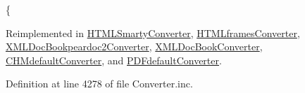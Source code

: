 \{ 

\-Reimplemented in \hyperlink{class_h_t_m_l_smarty_converter_a48d30cbead70c887449fda723aa0bb6e}{\-H\-T\-M\-L\-Smarty\-Converter}, \hyperlink{class_h_t_m_lframes_converter_a48d30cbead70c887449fda723aa0bb6e}{\-H\-T\-M\-Lframes\-Converter}, \hyperlink{class_x_m_l_doc_bookpeardoc2_converter_a48d30cbead70c887449fda723aa0bb6e}{\-X\-M\-L\-Doc\-Bookpeardoc2\-Converter}, \hyperlink{class_x_m_l_doc_book_converter_a48d30cbead70c887449fda723aa0bb6e}{\-X\-M\-L\-Doc\-Book\-Converter}, \hyperlink{class_c_h_mdefault_converter_a48d30cbead70c887449fda723aa0bb6e}{\-C\-H\-Mdefault\-Converter}, and \hyperlink{class_p_d_fdefault_converter_a48d30cbead70c887449fda723aa0bb6e}{\-P\-D\-Fdefault\-Converter}.



\-Definition at line 4278 of file \-Converter.\-inc.


